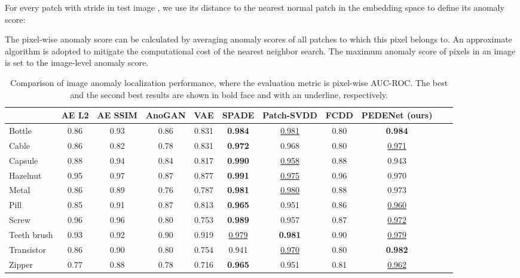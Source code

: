 \documentclass{article}
\begin{document}
For every patch  with stride
 in test image , we use its  distance to the nearest normal
patch in the embedding space to define its anomaly score:

The pixel-wise anomaly score can be calculated by averaging anomaly
scores of all patches to which this pixel belongs to. An approximate
algorithm is adopted to mitigate the computational cost of the nearest
neighbor search. The maximum anomaly score of pixels in an image is set
to the image-level anomaly score. 

\begin{table*}[!htbp]
\begin{center}
\caption{Comparison of image anomaly localization
performance, where the evaluation metric is pixel-wise AUC-ROC. The best
and the second best results are shown in bold face and with an
underline, respectively.}\label{tab1}
\begin{adjustbox}{width=1.0\textwidth,center}
    \begin{tabular}{|l|c|c|c|c|c|c|c|c|c|c}
\hline
      \textbf{} & AE L2 & AE SSIM & AnoGAN & VAE & SPADE & Patch-SVDD & FCDD &  PEDENet (ours) \\
      \hline
      Bottle & 0.86 & 0.93& 0.86 & 0.831 &  \textbf{0.984} &  \underline{0.981} & 0.80 & \textbf{0.984} \\
      Cable & 0.86 & 0.82& 0.78 & 0.831 &  \textbf{0.972} &   0.968 & 0.80 & \underline{0.971} \\
      Capsule & 0.88 & 0.94& 0.84 & 0.817 & \textbf{0.990}  & \underline{0.958} & 0.88 & 0.943 \\
      Hazelnut & 0.95 & 0.97& 0.87 & 0.877 & \textbf{0.991}   & \underline{0.975} & 0.96 & 0.970 \\
      Metal & 0.86 & 0.89& 0.76 & 0.787 & \textbf{0.981} &   \underline{0.980} & 0.88 & 0.973 \\
      Pill & 0.85 & 0.91& 0.87 & 0.813 & \textbf{0.965} &    0.951 & 0.86 & \underline{0.960} \\
      Screw & 0.96 & 0.96& 0.80 & 0.753 & \textbf{0.989} &   0.957 & 0.87 & \underline{0.972} \\
      Teeth brush & 0.93 &0.92 & 0.90 & 0.919 & \underline{0.979} & \textbf{0.981} & 0.90 & \underline{0.979}\\
      Transistor & 0.86 & 0.90& 0.80 & 0.754 & 0.941& \underline{0.970} & 0.80 & \textbf{0.982} \\
      Zipper & 0.77 & 0.88& 0.78 & 0.716 & \textbf{0.965} & 0.951 & 0.81 & \underline{0.962} \\ \hline

\end{tabular}
\end{adjustbox}
\end{center}
\end{table*}
\end{document}
